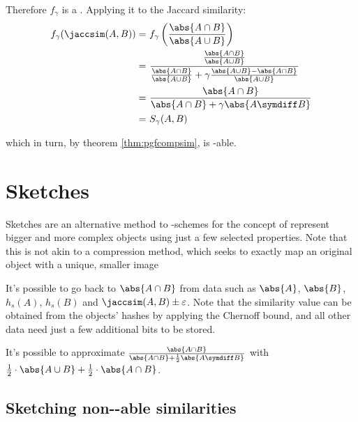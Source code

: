 Therefore $f_\gamma$ is a \pgf. Applying it to the Jaccard similarity:
\begin{align*}
        f_\gamma (\jaccsim(A, B))
    =&\ f_\gamma \left( \frac{\abs{A \cap B}}{\abs{A \cup B}} \right) \\
    =&\ \frac{\frac{\abs{A \cap B}}{\abs{A \cup B}}} {\frac{\abs{A \cap B}}{\abs{A \cup B}} + \gamma \frac{\abs{A \cup B} - \abs{A \cap B}}{\abs{A \cup B}}} \\
    =&\ \frac{\abs{A \cap B}} {\abs{A \cap B} + \gamma \abs{A \symdiff B}} \\
    =&\ S_\gamma(A, B)
\end{align*}

which in turn, by theorem \ref{thm:pgfcompsim}, is \lsh-able.


\section{Sketches}

Sketches are an alternative method to \lsh-schemes for the concept of  represent bigger and more complex objects using just a few selected properties. Note that this is not akin to a compression method, which seeks to exactly map an original object with a unique, smaller image

\begin{example}
    It's possible to go back to $\abs{A \cap B}$ from data such as $\abs{A}$, $\abs{B}$, $h_s(A)$, $h_s(B)$ and $\jaccsim(A, B) \pm \varepsilon$. Note that the similarity value can be obtained from the objects' hashes by applying the Chernoff bound, and all other data need just a few additional bits to be stored.
\end{example}

\begin{example}
    It's possible to approximate $\frac{\abs{A \cap B}}{\abs{A \cap B} + \frac{1}{2}\abs{A \symdiff B}}$ with $\frac{1}{2} \cdot \abs{A \cup B} + \frac{1}{2} \cdot \abs{A \cap B}$.
\end{example}

    
    
    
    
\subsection{Sketching non-\lsh-able similarities}

